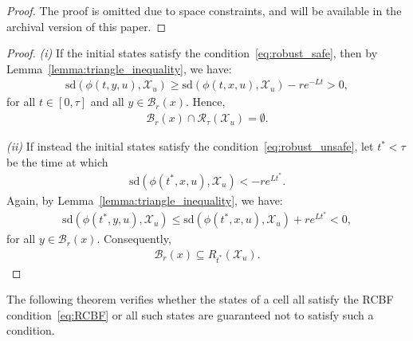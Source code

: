 \documentclass[letterpaper, 10 pt, conference]{ieeeconf}
\begin{document}
{
\begin{proof}
The proof is omitted due to space constraints, and will be available in the archival version of this paper.
\end{proof}
}{
\begin{proof}
\noindent
    \textit{(i)} If the initial states satisfy the condition~\eqref{eq:robust_safe}, then by Lemma~\ref{lemma:triangle_inequality}, we have:
    \begin{align*}
      \mathrm{sd}(\phi(t, y, u), \mathcal{X}_{u})
      \geq \mathrm{sd}(\phi(t, x, u), \mathcal{X}_{u})-re^{-Lt}>0,
    \end{align*}
    for all $t \in [0,\tau]$ and all $y \in \mathcal{B}_{r}(x)$.  Hence,
    \begin{align*}
      \mathcal{B}_{r}(x) \cap \mathcal{R}_{\tau}(\mathcal{X}_{u}) = \emptyset.
    \end{align*}

    \noindent
    \textit{(ii)} If instead the initial states satisfy the condition~\eqref{eq:robust_unsafe}, let $t^{*} < \tau$ be the time at which
    \begin{align*}
      \mathrm{sd}(\phi(t^{*}, x, u), \mathcal{X}_{u}) <-re^{Lt^{*}}.
    \end{align*}
    Again, by Lemma~\ref{lemma:triangle_inequality}, we have:
    \begin{align*}
      \mathrm{sd}(\phi(t^{*}, y, u), \mathcal{X}_{u})
      \le \mathrm{sd}(\phi(t^{*}, x, u), \mathcal{X}_{u})+re^{Lt^{*}}
      <0,
    \end{align*}
    for all $y \in \mathcal{B}_{r}(x)$.  Consequently,
    \begin{align*}
      \mathcal{B}_{r}(x) \subseteq R_{t^{*}}(\mathcal{X}_{u}).
    \end{align*}
\end{proof}}

The following theorem verifies whether the states of a cell all satisfy the RCBF condition~\eqref{eq:RCBF} or all such states are guaranteed not to satisfy such a condition.

\end{document}
